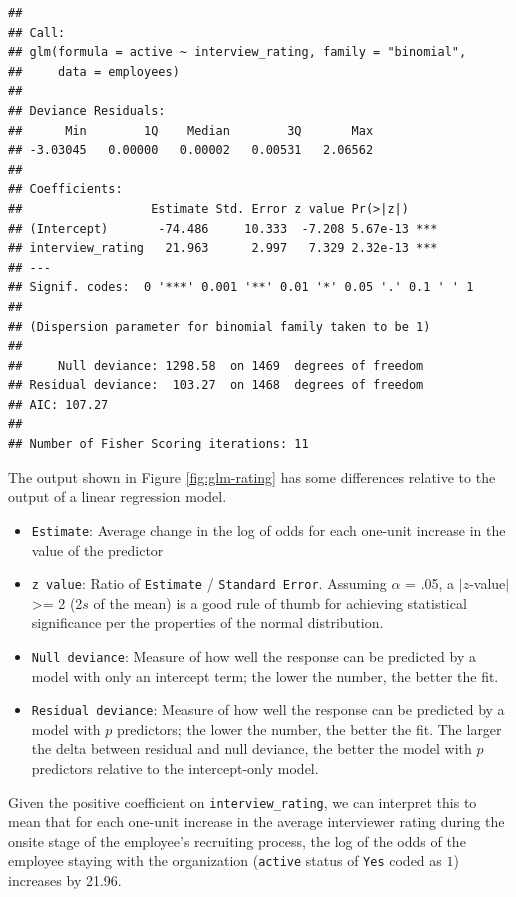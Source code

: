 \documentclass[
]{book}
\providecommand{\tightlist}{%
  \setlength{\itemsep}{0pt}\setlength{\parskip}{0pt}}
\begin{document}
\begin{verbatim}
## 
## Call:
## glm(formula = active ~ interview_rating, family = "binomial", 
##     data = employees)
## 
## Deviance Residuals: 
##      Min        1Q    Median        3Q       Max  
## -3.03045   0.00000   0.00002   0.00531   2.06562  
## 
## Coefficients:
##                  Estimate Std. Error z value Pr(>|z|)    
## (Intercept)       -74.486     10.333  -7.208 5.67e-13 ***
## interview_rating   21.963      2.997   7.329 2.32e-13 ***
## ---
## Signif. codes:  0 '***' 0.001 '**' 0.01 '*' 0.05 '.' 0.1 ' ' 1
## 
## (Dispersion parameter for binomial family taken to be 1)
## 
##     Null deviance: 1298.58  on 1469  degrees of freedom
## Residual deviance:  103.27  on 1468  degrees of freedom
## AIC: 107.27
## 
## Number of Fisher Scoring iterations: 11
\end{verbatim}

The output shown in Figure \ref{fig:glm-rating} has some differences relative to the output of a linear regression model.

\begin{itemize}
\tightlist
\item
  \texttt{Estimate}: Average change in the log of odds for each one-unit increase in the value of the predictor
\item
  \texttt{z\ value}: Ratio of \texttt{Estimate} / \texttt{Standard\ Error}. Assuming \(\alpha\) = .05, a \(|z\)-value\(|\) \textgreater= 2 (2\(s\) of the mean) is a good rule of thumb for achieving statistical significance per the properties of the normal distribution.
\item
  \texttt{Null\ deviance}: Measure of how well the response can be predicted by a model with only an intercept term; the lower the number, the better the fit.
\item
  \texttt{Residual\ deviance}: Measure of how well the response can be predicted by a model with \(p\) predictors; the lower the number, the better the fit. The larger the delta between residual and null deviance, the better the model with \(p\) predictors relative to the intercept-only model.
\end{itemize}

Given the positive coefficient on \texttt{interview\_rating}, we can interpret this to mean that for each one-unit increase in the average interviewer rating during the onsite stage of the employee's recruiting process, the log of the odds of the employee staying with the organization (\texttt{active} status of \texttt{Yes} coded as \(1\)) increases by 21.96.
\end{document}
